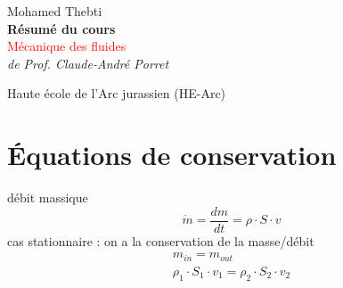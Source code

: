 \newcommand*{\titleTH}{\begingroup %
	\raggedleft %
	\vspace*{\baselineskip} %
	
	{\Large Mohamed Thebti}\\[0.167\textheight] %
	
	{\LARGE\bfseries Résumé du cours}\\[\baselineskip] %
	
	{\textcolor{Red}{\Huge Mécanique des fluides}}\\[\baselineskip] %
	
	{\Large \textit{de Prof. Claude-André Porret}}\par %
	
	\vfill %
	
	{\large Haute école de l'Arc jurassien (HE-Arc)}\par %
	
	\vspace*{3\baselineskip} %
	\endgroup}


 
	\pagestyle{empty} %
	
	\titleTH %
	
	
	\setlength{\parindent}{0cm}
	
	\newpage
	\tableofcontents
	
	\newpage
	\section{Équations de conservation}
	débit massique
	\begin{equation}
	\dot{m}=\frac{dm}{dt}=\rho \cdot S \cdot v
	\end{equation}
	cas stationnaire : on a la conservation de la masse/débit
	\begin{eqnarray}
	m_{in}=m_{out}\\
	\rho_1 \cdot S_1 \cdot v_1=\rho_2 \cdot S_2 \cdot v_2
	\end{eqnarray}

